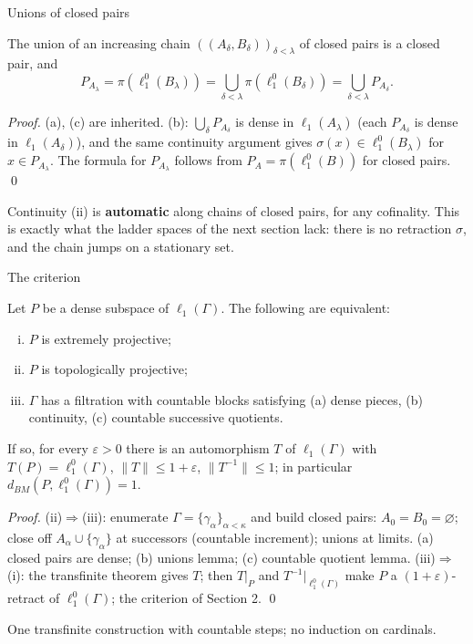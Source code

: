 \documentclass[10pt,aspectratio=169]{beamer}
\newcommand{\lo}[1]{\ell_1^0(#1)}
\newcommand{\ellone}[1]{\ell_1(#1)}
\newcommand{\BM}{d_{BM}}
\begin{document}
\begin{frame}{Unions of closed pairs}
  \begin{lemma}[unions]
    The union of an increasing chain ${((A_\delta,B_\delta))}_{\delta<\lambda}$ of
    closed pairs is a closed pair, and
    \[
      P_{A_\lambda}=\pi(\lo{B_\lambda})=\bigcup_{\delta<\lambda}\pi(\lo{B_\delta})=\bigcup_{\delta<\lambda}P_{A_\delta}.
    \]
  \end{lemma}
  \textit{Proof.} (a), (c) are inherited. (b): $\bigcup_\delta P_{A_\delta}$ is
  dense in $\ellone{A_\lambda}$ (each $P_{A_\delta}$ is dense in $\ellone{A_\delta}$),
  and the same continuity argument gives $\sigma(x)\in\lo{B_\lambda}$ for
  $x\in P_{A_\lambda}$. The formula for $P_{A_\lambda}$ follows from
  $P_A=\pi(\lo B)$ for closed pairs. \qed
  \begin{alertblock}{}
    Continuity (ii) is \textbf{automatic} along chains of closed pairs, for
    any cofinality. This is exactly what the ladder spaces of the next section
    lack: there is no retraction $\sigma$, and the chain jumps on a
    stationary set.
  \end{alertblock}
\end{frame}

\begin{frame}{The criterion}
  \begin{theorem}
    Let $P$ be a dense subspace of $\ellone\Gamma$. The following are equivalent:
    \begin{enumerate}[(i)]
      \item $P$ is extremely projective;
      \item $P$ is topologically projective;
      \item $\Gamma$ has a filtration with countable blocks satisfying
        (a) dense pieces, (b) continuity, (c) countable successive quotients.
    \end{enumerate}
    If so, for every $\varepsilon>0$ there is an automorphism $T$ of $\ellone\Gamma$
    with $T(P)=\lo\Gamma$, $\|T\|\le1+\varepsilon$, $\|T^{-1}\|\le1$; in particular
    $\BM(P,\lo\Gamma)=1$.
  \end{theorem}
  \textit{Proof.} (ii)$\Rightarrow$(iii): enumerate $\Gamma=\{\gamma_\alpha\}_{\alpha<\kappa}$
  and build closed pairs: $A_0=B_0=\varnothing$; close off $A_\alpha\cup\{\gamma_\alpha\}$
  at successors (countable increment); unions at limits. (a) closed pairs are
  dense; (b) unions lemma; (c) countable quotient lemma.
  (iii)$\Rightarrow$(i): the transfinite theorem gives $T$; then $T|_P$ and
  $T^{-1}|_{\lo\Gamma}$ make $P$ a $(1+\varepsilon)$-retract of $\lo\Gamma$;
  the criterion of Section 2. \qed
  \begin{alertblock}{}
    One transfinite construction with countable steps; no induction on cardinals.
  \end{alertblock}
\end{frame}
\end{document}
